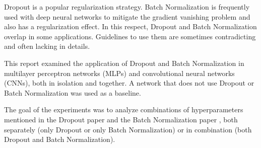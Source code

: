 \documentclass[../dropout-vs-batch-normalization.tex]{subfiles}
\begin{document}
Dropout is a popular regularization strategy. Batch Normalization is frequently used with deep neural networks to mitigate the gradient vanishing problem and also has a regularization effect. In this respect, Dropout and Batch Normalization overlap in some applications. Guidelines to use them are sometimes contradicting and often lacking in details.

This report examined the application of Dropout and Batch Normalization in multilayer perceptron networks (MLPs) and convolutional neural networks (CNNs), both in isolation and together. A network that does not use Dropout or Batch Normalization was used as a baseline.

The goal of the experiments was to analyze combinations of hyperparameters mentioned in the Dropout paper \cite{Srivastava2014} and the Batch Normalization paper \cite{Ioffe2015}, both separately (only Dropout or only Batch Normalization) or in combination (both Dropout and Batch Normalization).
\end{document}
